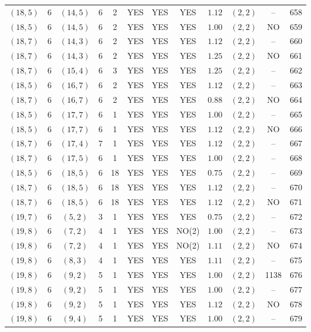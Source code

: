 \begin{longtable}{|c|c|c|c|c|c|c|c|c|c|c|c|}
$(18,5)$ & 6 & $(14,5)$ & 6 & 2 & YES & YES & YES & $1.12$ & $(2,2)$ & -- & 658\\
$(18,5)$ & 6 & $(14,5)$ & 6 & 2 & YES & YES & YES & $1.00$ & $(2,2)$ & NO & 659\\
$(18,7)$ & 6 & $(14,3)$ & 6 & 2 & YES & YES & YES & $1.12$ & $(2,2)$ & -- & 660\\
$(18,7)$ & 6 & $(14,3)$ & 6 & 2 & YES & YES & YES & $1.25$ & $(2,2)$ & NO & 661\\
$(18,7)$ & 6 & $(15,4)$ & 6 & 3 & YES & YES & YES & $1.25$ & $(2,2)$ & -- & 662\\
$(18,5)$ & 6 & $(16,7)$ & 6 & 2 & YES & YES & YES & $1.12$ & $(2,2)$ & -- & 663\\
$(18,7)$ & 6 & $(16,7)$ & 6 & 2 & YES & YES & YES & $0.88$ & $(2,2)$ & NO & 664\\
$(18,5)$ & 6 & $(17,7)$ & 6 & 1 & YES & YES & YES & $1.00$ & $(2,2)$ & -- & 665\\
$(18,5)$ & 6 & $(17,7)$ & 6 & 1 & YES & YES & YES & $1.12$ & $(2,2)$ & NO & 666\\
$(18,7)$ & 6 & $(17,4)$ & 7 & 1 & YES & YES & YES & $1.12$ & $(2,2)$ & -- & 667\\
$(18,7)$ & 6 & $(17,5)$ & 6 & 1 & YES & YES & YES & $1.00$ & $(2,2)$ & -- & 668\\
$(18,5)$ & 6 & $(18,5)$ & 6 & 18 & YES & YES & YES & $0.75$ & $(2,2)$ & -- & 669\\
$(18,7)$ & 6 & $(18,5)$ & 6 & 18 & YES & YES & YES & $1.12$ & $(2,2)$ & -- & 670\\
$(18,7)$ & 6 & $(18,5)$ & 6 & 18 & YES & YES & YES & $1.12$ & $(2,2)$ & NO & 671\\
$(19,7)$ & 6 & $(5,2)$ & 3 & 1 & YES & YES & YES & $0.75$ & $(2,2)$ & -- & 672\\
$(19,8)$ & 6 & $(7,2)$ & 4 & 1 & YES & YES & NO(2) & $1.00$ & $(2,2)$ & -- & 673\\
$(19,8)$ & 6 & $(7,2)$ & 4 & 1 & YES & YES & NO(2) & $1.11$ & $(2,2)$ & NO & 674\\
$(19,8)$ & 6 & $(8,3)$ & 4 & 1 & YES & YES & YES & $1.11$ & $(2,2)$ & -- & 675\\
$(19,8)$ & 6 & $(9,2)$ & 5 & 1 & YES & YES & YES & $1.00$ & $(2,2)$ & 1138 & 676\\
$(19,8)$ & 6 & $(9,2)$ & 5 & 1 & YES & YES & YES & $1.00$ & $(2,2)$ & -- & 677\\
$(19,8)$ & 6 & $(9,2)$ & 5 & 1 & YES & YES & YES & $1.12$ & $(2,2)$ & NO & 678\\
$(19,8)$ & 6 & $(9,4)$ & 5 & 1 & YES & YES & YES & $1.00$ & $(2,2)$ & -- & 679\\

\end{longtable}
